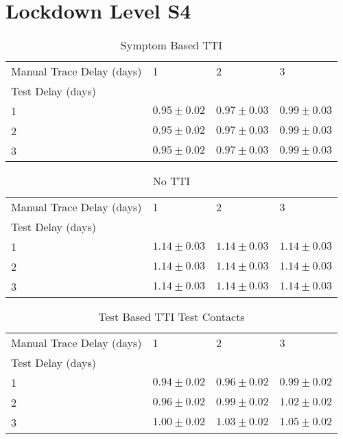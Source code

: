 \documentclass{article}
\begin{document}
\clearpage

\section{Lockdown Level S4}


    \begin{table}[H]
         \begin{tabular}{llll}
\toprule
Manual Trace Delay (days) &                1 &                2 &                3 \\
Test Delay (days) &                  &                  &                  \\
\midrule
1                 &  $0.95 \pm 0.02$ &  $0.97 \pm 0.03$ &  $0.99 \pm 0.03$ \\
2                 &  $0.95 \pm 0.02$ &  $0.97 \pm 0.03$ &  $0.99 \pm 0.03$ \\
3                 &  $0.95 \pm 0.02$ &  $0.97 \pm 0.03$ &  $0.99 \pm 0.03$ \\
\bottomrule
\end{tabular}

        \caption{Symptom Based TTI}
    \end{table}
    


    \begin{table}[H]
         \begin{tabular}{llll}
\toprule
Manual Trace Delay (days) &                1 &                2 &                3 \\
Test Delay (days) &                  &                  &                  \\
\midrule
1                 &  $1.14 \pm 0.03$ &  $1.14 \pm 0.03$ &  $1.14 \pm 0.03$ \\
2                 &  $1.14 \pm 0.03$ &  $1.14 \pm 0.03$ &  $1.14 \pm 0.03$ \\
3                 &  $1.14 \pm 0.03$ &  $1.14 \pm 0.03$ &  $1.14 \pm 0.03$ \\
\bottomrule
\end{tabular}

        \caption{No TTI}
    \end{table}
    


    \begin{table}[H]
         \begin{tabular}{llll}
\toprule
Manual Trace Delay (days) &                1 &                2 &                3 \\
Test Delay (days) &                  &                  &                  \\
\midrule
1                 &  $0.94 \pm 0.02$ &  $0.96 \pm 0.02$ &  $0.99 \pm 0.02$ \\
2                 &  $0.96 \pm 0.02$ &  $0.99 \pm 0.02$ &  $1.02 \pm 0.02$ \\
3                 &  $1.00 \pm 0.02$ &  $1.03 \pm 0.02$ &  $1.05 \pm 0.02$ \\
\bottomrule
\end{tabular}

        \caption{Test Based TTI Test Contacts}
    \end{table}
    
\end{document}
